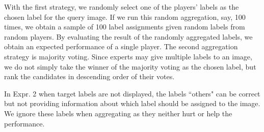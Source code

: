 With the first strategy, we randomly select one of the players' labels as the chosen label for the query image. 
If we run this random aggregation, say, 100 times, we obtain a sample of 100 label assignments given random labels from random players.
By evaluating the result of the randomly aggregated labels, we obtain an expected performance of a single player. 
%
The second aggregation strategy is majority voting. 
Since experts may give multiple labels to an image, 
we do not simply take the winner of the majority voting as the chosen label, but rank
the candidates in descending order of their votes.

In Expr. 2 when target labels are not displayed, the labels ``others" can be correct
but not providing information about which label should be assigned to the image.
We ignore these labels when aggregating as they neither hurt or help the performance. 

